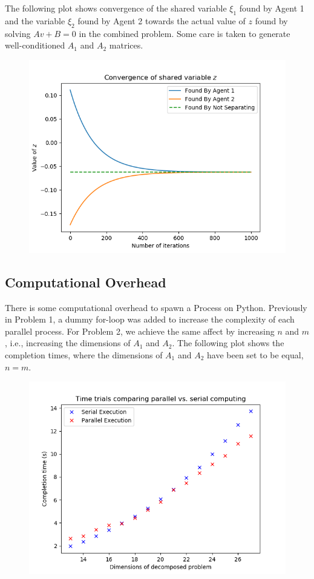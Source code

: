 \documentclass[12pt]{article}
\begin{document}
The following plot shows convergence of the shared variable $\xi_1$ found by Agent 1 and the variable $\xi_2$ found by Agent 2 towards the actual value of $z$ found by solving $Av+B=0$ in the combined problem. Some care is taken to generate well-conditioned $A_1$ and $A_2$ matrices.

\begin{figure}[H]
	\includegraphics[scale=1]{Problem2-Convergence.png}
\end{figure}

\subsection*{Computational Overhead}

There is some computational overhead to spawn a Process on Python. Previously in Problem 1, a dummy for-loop was added to increase the complexity of each parallel process. For Problem 2, we achieve the same affect by increasing $n$ and $m$, i.e., increasing the dimensions of $A_1$ and $A_2$. The following plot shows the completion times, where the dimensions of $A_1$ and $A_2$ have been set to be equal, $n=m$.

\begin{figure}[H]
	\includegraphics[scale=1]{Problem2-TimeTrial.png}
\end{figure}
\end{document}
